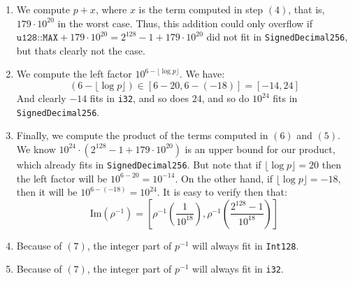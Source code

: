 \documentclass[11pt]{article}
\begin{document}
\begin{enumerate}[label=(\arabic*).]
    \item We compute $p + x$, where $x$ is the term computed in step $(4)$,
        that is, $179\cdot 10^{20}$ in the worst case. Thus, this addition
        could only overflow if $\texttt{u128::MAX} + 179\cdot 10^{20} = 2^{128}
        - 1 + 179\cdot 10^{20}$ did not fit in \texttt{SignedDecimal256}, but
        thats clearly not the case.
    \item We compute the left factor $10^{6-\lfloor\log p\rfloor}$. We have:
        $$
	        (6 - \lfloor\log p\rfloor) \in [6 - 20, 6 -(-18)] =[-14, 24]
        $$
        And clearly $-14$ fits in \texttt{i32}, and so does $24$, and so do
        $10^{24}$ fits in \texttt{SignedDecimal256}.
    \item Finally, we compute the product of the terms computed in $(6)$ and $(5)$.
        We know $10^{24}\cdot (2^{128} - 1+179\cdot 10^{20})$
        is an upper bound for our product, which already fits in \texttt{SignedDecimal256}. But note that if 
        $\lfloor\log p\rfloor = 20$ then the left factor will be $10^{6-20} = 10^{-14}$.
        On the other hand, if $\lfloor\log p\rfloor = -18$, then it will be $10^{6-(-18)}=10^{24}$.
        It is easy to verify then that:
        \[
            \text{Im}(\rho^{-1}) = \left[ \rho^{-1}\left(\frac 1{10^{18}}\right),
            \rho^{-1}\left(\frac{2^{128}-1}{10^{18}}\right) \right]
        \]
    \item Because of $(7)$, the integer part of $p^{-1}$ will always fit in
        \texttt{Int128}.
    \item Because of $(7)$, the integer part of $p^{-1}$ will always fit in
        \texttt{i32}.
\end{enumerate}


\break


\end{document}
